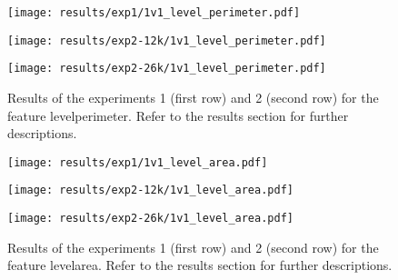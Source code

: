 \begin{figure}[h!]
    \centering
	\begin{minipage}{0.3\linewidth}
		\texttt{[image: results/exp1/1v1\_level\_perimeter.pdf]}
	\end{minipage}

	\begin{minipage}{0.3\linewidth}
		\texttt{[image: results/exp2-12k/1v1\_level\_perimeter.pdf]}
	\end{minipage}
	\begin{minipage}{0.3\linewidth}
		\texttt{[image: results/exp2-26k/1v1\_level\_perimeter.pdf]}
	\end{minipage}

	\caption[ Results: Feature level\textunderscore perimeter]{ Results of the experiments 1 (first row) and 2 (second row) for the feature level\textunderscore perimeter. Refer to the results section for further descriptions. }
	\label{fig:appendix_level_perimeter}
\end{figure}
 \newpage 

 
\begin{figure}[h!]
    \centering
	\begin{minipage}{0.3\linewidth}
		\texttt{[image: results/exp1/1v1\_level\_area.pdf]}
	\end{minipage}

	\begin{minipage}{0.3\linewidth}
		\texttt{[image: results/exp2-12k/1v1\_level\_area.pdf]}
	\end{minipage}
	\begin{minipage}{0.3\linewidth}
		\texttt{[image: results/exp2-26k/1v1\_level\_area.pdf]}
	\end{minipage}

	\caption[ Results: Feature level\textunderscore area]{ Results of the experiments 1 (first row) and 2 (second row) for the feature level\textunderscore area. Refer to the results section for further descriptions. }
	\label{fig:appendix_level_area}
\end{figure}
 

